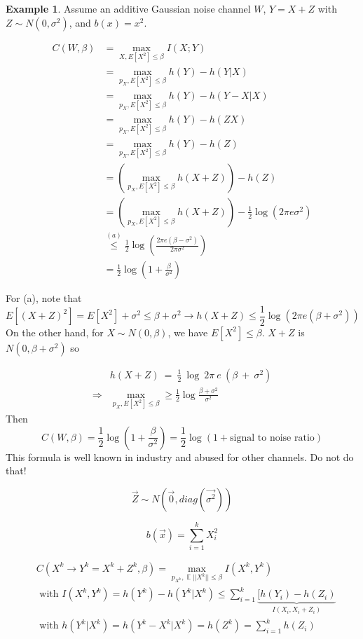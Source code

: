 \documentclass[twoside]{article}
\theoremstyle{definition} %
\newtheorem{example}{Example}
\newcommand{\Ex}[1]{E\left[#1\right]}
\newcommand{\pfrac}[2]{\left( \frac{#1}{#2} \right)}
\DeclareMathOperator{\E}{\mathbb{E}}%
\begin{document}
\begin{example}
  Assume an additive Gaussian noise channel $W$, $Y=X+Z$ with $Z \sim N(0, \sigma^2)$, and $b(x) = x^2$.

  \begin{align*}
    C(W, \beta) &= \max_{X, \Ex{X^2} \leq \beta} I(X;Y) \\
    &= \max_{p_X, \Ex{X^2} \leq \beta} h(Y) - h(Y|X) \\
    &= \max_{p_X, \Ex{X^2} \leq \beta} h(Y) - h(Y-X|X) \\
    &= \max_{p_X, \Ex{X^2} \leq \beta} h(Y) - h(ZX) \\
    &= \max_{p_X, \Ex{X^2} \leq \beta} h(Y) - h(Z) \\
    &= \left(\max_{p_X, \Ex{X^2} \leq \beta} h(X+Z)\right) - h(Z) \\
    &= \left(\max_{p_X, \Ex{X^2} \leq \beta} h(X+Z)\right) - \frac 1 2 \log(2\pi e \sigma^2) \\
    &\overset{(a)}\leq \frac 1 2 \log \pfrac{2\pi e (\beta - \sigma^2)}{2\pi \sigma^2}\\
    &= \frac 1 2 \log \left(1 + \frac \beta {\sigma^2}\right)
  \end{align*}

  For (a), note that
  \[
    \Ex{(X+Z)^2} = \Ex{X^2} + \sigma^2 \leq \beta + \sigma^2 \to h(X+Z) \leq \frac 1 2 \log (2\pi e (\beta + \sigma^2))
  \]
  On the other hand, for $X \sim N(0, \beta)$, we have $\Ex{X^2}\leq \beta$. $X+Z$ is $N(0, \beta+\sigma^2)$ so

  \begin{align*}
    &h(X+Z)~=~\frac 1 2~\log~2\pi~e~(\beta~+~\sigma^2)\\
\Rightarrow&\max_{p_X, \Ex{X^2} \leq \beta} \geq \frac 1 2 \log \frac {\beta + \sigma^2} {\sigma^2}
  \end{align*}
  Then
  \[
    C(W,\beta)= \frac 1 2 \log\left(1 + \frac \beta {\sigma^2} \right) = \frac 1 2 \log(1 + \text{signal to noise ratio})
  \]
  This formula is well known in industry and abused for other channels. Do not do that!
\end{example}




\[
  \vec{Z} \sim N(\vec{0}, diag(\vec{\sigma^2}))
\]

\[
  b(\vec{x}) = \sum_{i = 1}^k X_i^2
\]

\begin{align*}
  &C(X^k \rightarrow Y^k = X^k + Z^k, \beta) = \max_{p_{X^k}, \E{||X^k||} \leq \beta} I(X^k, Y^k) \\
  & \text{ with } I(X^k, Y^k) = h(Y^k) - h(Y^k | X^k) \leq \sum_{i = 1}^k \underbrace{[h(Y_i) - h(Z_i)}_{I(X_i, X_i + Z_i)} \\
  & \text{ with } h(Y^k | X^k) = h(Y^k - X^k | X^k) = h(Z^k) = \sum_{i = 1}^k h(Z_i)
\end{align*}
\end{document}
